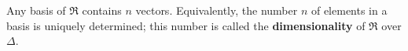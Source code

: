 Any basis of $\mathfrak{R}$ contains $n$ vectors. Equivalently, the number $n$ of elements in a basis is uniquely determined; this number is called the \textbf{dimensionality} of $\mathfrak{R}$ over $\Delta$.
